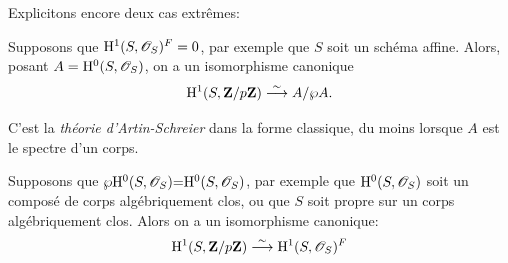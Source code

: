 Explicitons encore deux cas extr\^emes:

\begin{corollaire}
\label{XI.6.9} Supposons que $\H^1(S,\cal{O}_S)^F=0$, par exemple
que $S$ soit un sch\'ema affine. Alors, posant
$A=\H^0(S,\cal{O}_S)$, on a un isomorphisme canonique
$$
\mathrm{H}^1(S,\mathbf{Z}/p\mathbf{Z})\overset{\sim}{\longrightarrow} A/\wp A.
$$
\end{corollaire}

C'est la \emph{théorie d'Artin-Schreier} dans la forme classique,
du moins lorsque $A$ est le spectre d'un corps.

\begin{corollaire}
\label{XI.6.10}
Supposons
que $\wp\H^0(S,\cal{O}_S){=}\H^0(S,\cal{O}_S)$, par exemple
que $\H^0(S,\cal{O}_S)$ soit un compos\'e de corps
alg\'ebriquement clos, ou que $S$ soit propre sur un corps
alg\'ebriquement clos. Alors on a un isomorphisme canonique:
$$
\H^1(S,\ZZ/p\ZZ)\isomto\H^1(S,\cal{O}_S)^F
$$
\end{corollaire}

